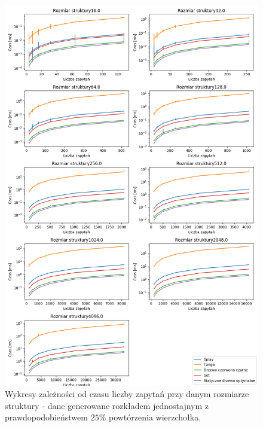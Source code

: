 \documentclass[declaration,shortabstract]{iithesis}
\theoremstyle{thm}
\theoremstyle{remark}
\theoremstyle{plain}
\theoremstyle{plain}
\theoremstyle{plain}
\begin{document}
\begin{figure}[H]  
\centering
    \includegraphics[scale=0.5]{wykresy/uniform75.png}
      \caption{Wykresy zależności od czasu liczby zapytań przy danym rozmiarze struktury - dane generowane rozkładem jednostajnym z prawdopodobieństwem  \(25\%\) powtórzenia wierzchołka. }  
    \label{fig:zigzig} 
\end{figure}
\end{document}
